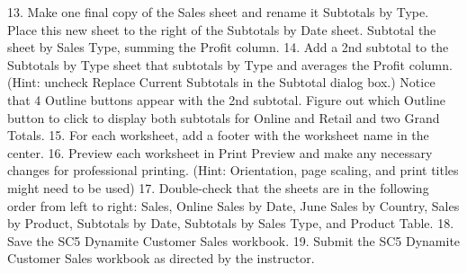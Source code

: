 13. Make one final copy of the Sales sheet and rename it Subtotals by Type. Place this new sheet to
the right of the Subtotals by Date sheet. Subtotal the sheet by Sales Type, summing the Profit
column.
14. Add a 2nd subtotal to the Subtotals by Type sheet that subtotals by Type and averages the Profit
column. (Hint: uncheck Replace Current Subtotals in the Subtotal dialog box.) Notice that 4
Outline buttons appear with the 2nd subtotal. Figure out which Outline button to click to
display both subtotals for Online and Retail and two Grand Totals.
15. For each worksheet, add a footer with the worksheet name in the center.
16. Preview each worksheet in Print Preview and make any necessary changes for professional
printing. (Hint: Orientation, page scaling, and print titles might need to be used)
17. Double-check that the sheets are in the following order from left to right: Sales, Online Sales by Date, June Sales by Country, Sales by Product, Subtotals by Date, Subtotals by Sales Type, and Product Table.
18. Save the SC5 Dynamite Customer Sales workbook.
19. Submit the SC5 Dynamite Customer Sales workbook as directed by the instructor.


